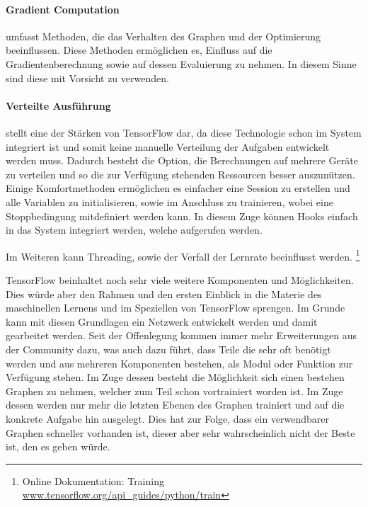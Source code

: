 \paragraph{Gradient Computation} umfasst Methoden, die das Verhalten des Graphen und der Optimierung beeinflussen. 
Diese Methoden ermöglichen es, Einfluss auf die Gradientenberechnung sowie auf dessen Evaluierung zu nehmen. 
In diesem Sinne sind diese mit Vorsicht zu verwenden.

\paragraph{Verteilte Ausführung} stellt eine der Stärken von TensorFlow dar, da diese Technologie schon im System integriert ist und somit keine manuelle Verteilung der Aufgaben entwickelt werden muss. 
Dadurch besteht die Option, die Berechnungen auf mehrere Geräte zu verteilen und so die zur Verfügung stehenden Ressourcen besser auszunützen. \\

\noindent
Einige Komfortmethoden ermöglichen es einfacher eine Session zu erstellen und alle Variablen zu initialisieren, sowie im Anschluss zu trainieren, wobei eine Stoppbedingung mitdefiniert werden kann.
In diesem Zuge können Hooks einfach in das System integriert werden, welche aufgerufen werden.

\noindent
Im Weiteren kann Threading, sowie der Verfall der Lernrate beeinflusst werden. \footnote{Online Dokumentation: Training \url{www.tensorflow.org/api_guides/python/train}}
\phantom \newline



\noindent
TensorFlow beinhaltet noch sehr viele weitere Komponenten und Möglichkeiten. 
Dies würde aber den Rahmen und den ersten Einblick in die Materie des maschinellen Lernens und im Speziellen von TensorFlow sprengen. 
Im Grunde kann mit diesen Grundlagen ein Netzwerk entwickelt werden und damit gearbeitet werden. 
Seit der Offenlegung kommen immer mehr Erweiterungen aus der Community dazu, was auch dazu führt, dass Teile die sehr oft benötigt werden und aus mehreren Komponenten bestehen, als Modul oder Funktion zur Verfügung stehen. 
Im Zuge dessen besteht die Möglichkeit sich einen bestehen Graphen zu nehmen, welcher zum Teil schon vortrainiert worden ist. 
Im Zuge dessen werden nur mehr die letzten Ebenen des Graphen trainiert und auf die konkrete Aufgabe hin ausgelegt. 
Dies hat zur Folge, dass ein verwendbarer Graphen schneller vorhanden ist, dieser aber sehr wahrscheinlich nicht der Beste ist, den es geben würde. 

